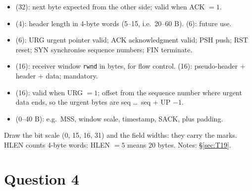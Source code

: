 \begin{solution}
\begin{itemize}
  \item {} (32): next byte expected from the other side; valid when ACK $=1$.
  \item {} (4): header length in 4-byte words (5--15, i.e.\ 20--60 B).  (6): future use.
  \item {} (6): URG urgent pointer valid; ACK acknowledgment valid; PSH push; RST reset; SYN synchronise sequence numbers; FIN terminate.
  \item {} (16): receiver window \texttt{rwnd} in bytes, for flow control.  (16): pseudo-header + header + data; mandatory.
  \item {} (16): valid when URG $=1$; offset from the sequence number where urgent data ends, so the urgent bytes are seq \ldots\ seq $+$ UP $-1$.
  \item {} (0--40 B): e.g.\ MSS, window scale, timestamp, SACK, plus padding.
\end{itemize}
\end{solution}
\begin{warningbox}Draw the bit scale (0, 15, 16, 31) and the field widths: they carry the marks. HLEN counts 4-byte words: HLEN $=5$ means 20 bytes. Notes: \S\ref{sec:T19}.\end{warningbox}

\section{Question 4}

